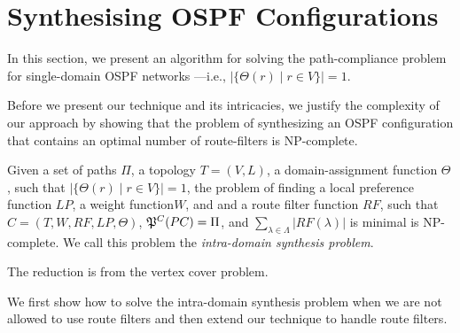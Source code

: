 \section{Synthesising OSPF Configurations} \label{sec:synthesis}
In this section, we present an algorithm for 
solving the path-compliance problem for 
single-domain OSPF networks
---i.e., $|\{\Theta(r) \mid r\in V\}|=1$.


Before we present our technique and its intricacies,
we justify the complexity of our approach by showing that
the problem of synthesizing an OSPF configuration
that contains an optimal number of route-filters is NP-complete.

\begin{theorem}
\label{thm:ospfsynth}
Given a set of paths $\Pi$,
a topology $T=(V,L)$,
a domain-assignment function $\Theta$, such that $|\{\Theta(r) \mid r\in V\}|=1$,
the problem of finding 
a local preference  function $LP$, 
a weight function$W$, and 
and a route filter function $RF$,  such that
$C=(T,W,RF,LP,\Theta)$,
$\mathfrak{P}^C(PC) = \Pi$,
and 
$\sum_{\lambda\in\Lambda} |RF(\lambda)|$ is minimal is NP-complete.
We call this problem the \emph{intra-domain synthesis problem}.
\end{theorem}
\iffull

\else
The reduction is from the vertex cover problem.
\fi

We first show how to solve the intra-domain synthesis problem when
we are not allowed to use route filters
and then
extend our technique to handle route filters.

